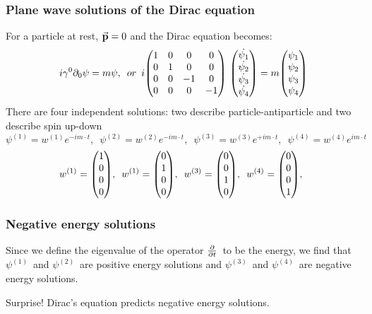 \begin{frame}
\frametitle{Plane wave solutions of the Dirac equation}
For a particle at rest, $\va{p} = 0$ and the Dirac equation becomes:
\[
i\gamma^0\partial_0\psi = m \psi, \,\,\, or \, \, \,  i \mqty(1 & 0 & 0 & 0\\ 0 & 1 & 0 & 0 \\
0 & 0 & -1 & 0 \\ 0 & 0 & 0 & -1 ) \ \mqty(\dot{\psi_1} \\ \dot{\psi_2}\\ \dot{\psi_3} \\ \dot{\psi_4}) = 
m \mqty(\psi_1 \\ \psi_2\\ \psi_3 \\ \psi_4)
\]
There are four independent solutions: two describe particle-antiparticle and two describe spin up-down
\[
\psi^{(1)} = w^{(1)} e^{-i m\cdot t}, \,\,\, \psi^{(2)} = w^{(2)} e^{-i m\cdot t}, \,\,\,
\psi^{(3)} = w^{(3)} e^{+i m\cdot t}, \,\,\, \psi^{(4)} = w^{(4)} e^{i m\cdot t}
\]
\[
w^{(1)} = \mqty(1 \\ 0 \\ 0 \\ 0), \,\,\, w^{(1)} = \mqty(0\\ 1 \\ 0 \\ 0), \,\,\,
w^{(3)} = \mqty(0 \\ 0 \\ 1 \\ 0), \,\,\, w^{(4)} = \mqty(0 \\ 0 \\ 0 \\ 1), \,\,\,
\]

\end{frame}
%
\begin{frame}
\frametitle{Negative energy solutions}

Since we define the eigenvalue of the operator $\pdv{t}$~to be the energy, we find that 
$\psi^{(1)}$~and $\psi^{(2)}$~are positive energy solutions and 
$\psi^{(3)}$~and $\psi^{(4)}$~are negative energy solutions.

\begin{alertblock}{Surprise!}
Dirac's equation \alert{predicts} negative energy solutions.
\end{alertblock}
\end{frame}

